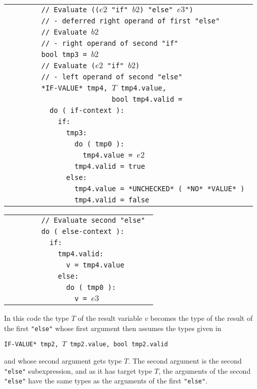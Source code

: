 \documentclass[12pt]{article}
\newenvironment{indpar}[1][0.3in]%
	{\begin{list}{}%
		     {\setlength{\itemsep}{0in}%
		      \setlength{\topsep}{0in}%
		      \setlength{\parsep}{1ex}%
		      \setlength{\labelwidth}{#1}%
		      \setlength{\leftmargin}{#1}%
		      \addtolength{\leftmargin}{\labelsep}}%
	 \item}%
	{\end{list}}
\begin{document}
\begin{indpar}
\begin{tabular}{l}
\tt ~~~~~~~~// Evaluate (($e2$ "if" $b2$) "else" $e3$") \\
\tt ~~~~~~~~// - deferred right operand of first "else" \\
\tt ~~~~~~~~// Evaluate $b2$ \\
\tt ~~~~~~~~// - right operand of second "if" \\
\tt ~~~~~~~~bool tmp3 = $b2$ \\
\tt ~~~~~~~~// Evaluate ($e2$ "if" $b2$) \\
\tt ~~~~~~~~// - left operand of second "else" \\
\tt ~~~~~~~~*IF-VALUE* tmp4, $T$ tmp4.value, \\
\tt ~~~~~~~~~~~~~~~~~~~~~~~~~bool tmp4.valid = \\
\tt ~~~~~~~~~~do ( if-context ): \\
\tt ~~~~~~~~~~~~if: \\
\tt ~~~~~~~~~~~~~~tmp3: \\
\tt ~~~~~~~~~~~~~~~~do ( tmp0 ): \\
\tt ~~~~~~~~~~~~~~~~~~tmp4.value = $e2$ \\
\tt ~~~~~~~~~~~~~~~~tmp4.valid = true \\
\tt ~~~~~~~~~~~~~~else: \\
\tt ~~~~~~~~~~~~~~~~tmp4.value = *UNCHECKED* ( *NO* *VALUE* ) \\
\tt ~~~~~~~~~~~~~~~~tmp4.valid = false \\
\end{tabular}

\begin{tabular}{l}
\tt ~~~~~~~~// Evaluate second "else" \\
\tt ~~~~~~~~do ( else-context ): \\
\tt ~~~~~~~~~~if: \\
\tt ~~~~~~~~~~~~tmp4.valid: \\
\tt ~~~~~~~~~~~~~~v = tmp4.value \\
\tt ~~~~~~~~~~~~else: \\
\tt ~~~~~~~~~~~~~~do ( tmp0 ): \\
\tt ~~~~~~~~~~~~~~~~v = $e3$ \\
\end{tabular}

\end{indpar}

In this code the type $T$ of the result variable $v$ becomes
the type of the result of the first {\tt "else"} whose
first argument then assumes the types given in
\begin{center}
\tt *IF-VALUE* tmp2, $T$ tmp2.value, bool tmp2.valid
\end{center}
and whose second argument gets type $T$.  The second argument
is the second {\tt "else"} subexpression, and as it has
target type $T$, the arguments of the second {\tt "else"}
have the same types as the arguments of the first {\tt "else"}.
\end{document}
